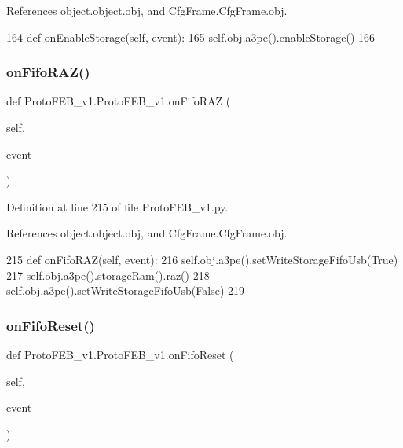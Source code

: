 References object.\+object.\+obj, and Cfg\+Frame.\+Cfg\+Frame.\+obj.


\begin{DoxyCode}
164     \textcolor{keyword}{def }onEnableStorage(self, event):
165         self.obj.a3pe().enableStorage()
166 
\end{DoxyCode}
\mbox{\label{classProtoFEB__v1_1_1ProtoFEB__v1_a7abdc74a7edba3a8e7c3b4bc4a616664}} 
\subsubsection{\texorpdfstring{on\+Fifo\+R\+A\+Z()}{onFifoRAZ()}}
{\footnotesize\ttfamily def Proto\+F\+E\+B\+\_\+v1.\+Proto\+F\+E\+B\+\_\+v1.\+on\+Fifo\+R\+AZ (\begin{DoxyParamCaption}\item[{}]{self,  }\item[{}]{event }\end{DoxyParamCaption})}



Definition at line 215 of file Proto\+F\+E\+B\+\_\+v1.\+py.



References object.\+object.\+obj, and Cfg\+Frame.\+Cfg\+Frame.\+obj.


\begin{DoxyCode}
215     \textcolor{keyword}{def }onFifoRAZ(self, event):
216         self.obj.a3pe().setWriteStorageFifoUsb(\textcolor{keyword}{True})
217         self.obj.a3pe().storageRam().raz()
218         self.obj.a3pe().setWriteStorageFifoUsb(\textcolor{keyword}{False})
219 
\end{DoxyCode}
\mbox{\label{classProtoFEB__v1_1_1ProtoFEB__v1_aa63a526f65c5a13a99d56c89bcb4c7f7}} 
\subsubsection{\texorpdfstring{on\+Fifo\+Reset()}{onFifoReset()}}
{\footnotesize\ttfamily def Proto\+F\+E\+B\+\_\+v1.\+Proto\+F\+E\+B\+\_\+v1.\+on\+Fifo\+Reset (\begin{DoxyParamCaption}\item[{}]{self,  }\item[{}]{event }\end{DoxyParamCaption})}




